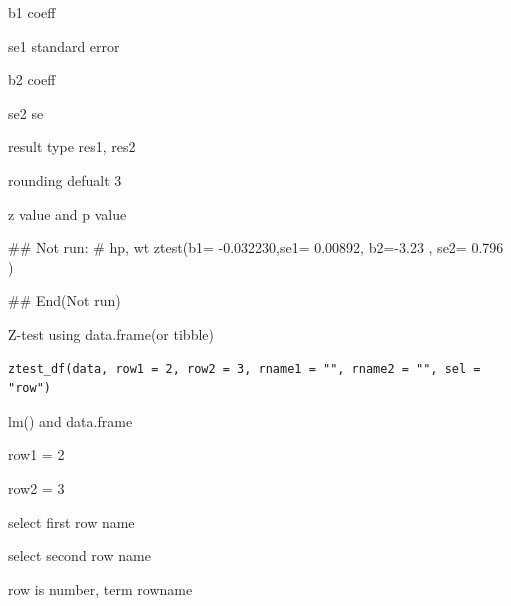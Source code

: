 \documentclass[a4paper]{book}
\begin{document}
%
\begin{Arguments}
\begin{ldescription}
\item[\code{b1}] b1 coeff

\item[\code{se1}] se1 standard error

\item[\code{b2}] b2 coeff

\item[\code{se2}] se2 se

\item[\code{type}] result type res1, res2

\item[\code{digits}] rounding defualt 3
\end{ldescription}
\end{Arguments}
%
\begin{Value}
z value and p value
\end{Value}
%
\begin{Examples}
\begin{ExampleCode}
## Not run: 
# hp, wt
ztest(b1= -0.032230,se1= 0.00892,   b2=-3.23 , se2= 0.796 )

## End(Not run)


\end{ExampleCode}
\end{Examples}
%
\begin{Description}
Z-test using data.frame(or tibble)
\end{Description}
%
\begin{Usage}
\begin{verbatim}
ztest_df(data, row1 = 2, row2 = 3, rname1 = "", rname2 = "", sel = "row")
\end{verbatim}
\end{Usage}
%
\begin{Arguments}
\begin{ldescription}
\item[\code{data}] lm() and data.frame

\item[\code{row1}] row1 = 2

\item[\code{row2}] row2 = 3

\item[\code{rname1}] select first row name

\item[\code{rname2}] select second row name

\item[\code{sel}] row is number, term rowname
\end{ldescription}
\end{Arguments}
\end{document}
